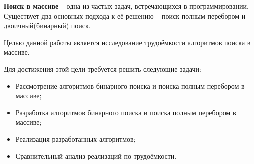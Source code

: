 
\textbf{Поиск в массиве} – одна из частых задач, встречающихся в программировании. Существует два основных подхода к её решению – поиск полным перебором и двоичный(бинарный) поиск.

Целью данной работы является исследование трудоёмкости алгоритмов поиска в массиве.

Для достижения этой цели требуется решить следующие задачи:

\begin{itemize}
	\item Рассмотрение алгоритмов бинарного поиска и поиска полным перебором в массиве;
	\item Разработка алгоритмов бинарного поиска и поиска полным перебором в массиве;
	\item Реализация разработанных алгоритмов;
	\item Сравнительный анализ реализаций по трудоёмкости. 
\end{itemize}

\newpage

\clearpage
